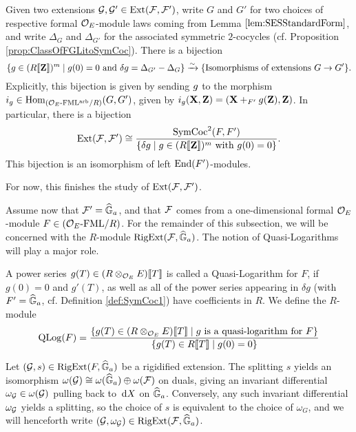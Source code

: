 \documentclass[../main.tex]{subfiles}
\begin{document}
\begin{prop}\label{prop:ExtInTermsOfSymCoc}
  Given two extensions $\mathcal{G},\mathcal{G}' \in \operatorname{Ext}(\mathcal{F}, \mathcal{F}')$, write 
  $G$ and $G'$ for two choices of respective formal $\mathcal{O}_E$-module laws coming
  from Lemma $\ref{lem:SESStandardForm}$, and write
  $\Delta_G$ and $\Delta_{G'}$ for the associated symmetric $2$-cocycles (cf.
  Proposition \ref{prop:ClassOfFGLitoSymCoc}). There is a bijection
  \begin{equation*}
    \{{g} \in (R\llbracket \mathbf{Z} \rrbracket)^m \mid {g}(0) = 0 \text{ and } \delta {g} =
    \Delta_{G'} - \Delta_G\} \xrightarrow{\sim} \{\text{Isomorphisms of extensions } 
      G \to G' \}. 
  \end{equation*}
  Explicitly, this bijection is given by sending ${g}$ to the morphism
  $i_{g} \in \operatorname{Hom}_{{({\mathcal{O}_E}\textnormal-\allowbreak\mathrm{FML^{arb}}/{R})}}(G, G')$, given by 
  $i_{g} (\mathbf{X}, \mathbf{Z}) = (\mathbf{X} +_{F'} {g}(\mathbf{Z}), \mathbf{Z})$. In particular, there is a bijection
  \begin{equation*}
    \operatorname{Ext}(\mathcal{F}, \mathcal{F}') \cong \frac{\operatorname{SymCoc}^2(F, F')}{\{\delta {g} 
    \mid {g} \in (R\llbracket \mathbf{Z} \rrbracket)^m \text{ with } {g}(0) = 0\}}.
  \end{equation*}
  This bijection is an isomorphism of left $\operatorname{End}(F')$-modules.
\end{prop}
For now, this finishes the study of $\operatorname{Ext}(\mathcal{F}, \mathcal{F}')$. 

Assume now that $\mathcal{F}' = \widehat{\mathbb{G}}_a$, and that 
$\mathcal{F}$ comes from a one-dimensional formal $\mathcal{O}_E$-module $F \in {({\mathcal{O}_E}\textnormal-\allowbreak\mathrm{FML}/{R})}$. For
the remainder of this subsection, we will be concerned with the $R$-module
$\operatorname {RigExt}(\mathcal{F}, \widehat{\mathbb{G}}_a)$. The notion of Quasi-Logarithms will play a major role.

\begin{defi}\label{def:QuasiLogarithm}
  A power series $g(T) \in (R \otimes_{\mathcal{O}_E} E) \llbracket T \rrbracket$ is called a 
  Quasi-Logarithm for $F$, if $g(0) = 0$ and $g'(T)$, as well as all 
  of the power series appearing in $\delta g$ (with $F' = \widehat{\mathbb{G}}_a$, cf.
  Definition \ref{def:SymCoc1})
  have coefficients in $R$. We define the $R$-module
  \begin{equation*}
    \operatorname {QLog}(F) = \frac{\{g(T) \in (R \otimes_{\mathcal{O}_E} E) \llbracket T \rrbracket \mid g \text{ is a 
    quasi-logarithm for } F\}}{\{g(T) \in R\llbracket T \rrbracket \mid g(0) = 0\}}
  \end{equation*}
\end{defi}

Let $(\mathcal{G},s) \in \operatorname {RigExt}(F,\widehat{\mathbb{G}}_a)$ be a rigidified extension. 
The splitting $s$ yields an isomorphism $\omega(\mathcal{G}) \cong \omega(\widehat{\mathbb{G}}_a) \oplus
\omega(\mathcal{F})$ on duals, giving an invariant differential $\omega_{\mathcal{G}} \in
\omega(\mathcal{G})$ pulling back to $\, \mathrm{d} X$ on $\widehat{\mathbb{G}}_a$. Conversely, any such invariant
differential $\omega_{\mathcal{G}}$ yields a splitting, so the choice of $s$ is
equivalent to the choice of $\omega_G$, and we will henceforth write 
$(\mathcal{G}, \omega_{\mathcal{G}}) \in \operatorname {RigExt}(\mathcal{F}, \widehat{\mathbb{G}}_a)$. 
\end{document}
